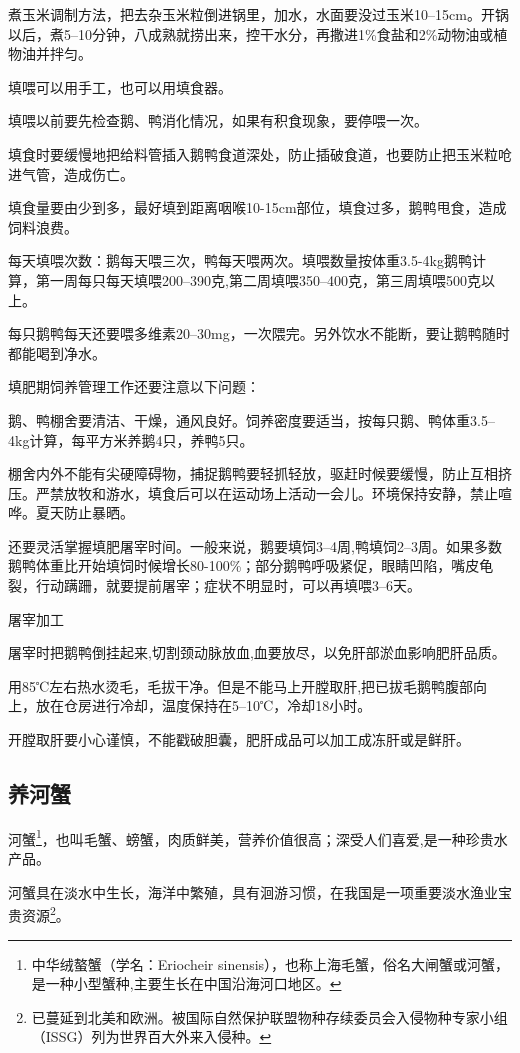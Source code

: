 \documentclass{ctexbook}
\begin{document}
煮玉米调制方法，把去杂玉米粒倒进锅里，加水，水面要没过玉米10--15cm。开锅以后，煮5--10分钟，八成熟就捞出来，控干水分，再撒进1\%食盐和2\%动物油或植物油并拌匀。

填喂可以用手工，也可以用填食器。

填喂以前要先检查鹅、鸭消化情况，如果有积食现象，要停喂一次。

填食时要缓慢地把给料管插入鹅鸭食道深处，防止插破食道，也要防止把玉米粒呛进气管，造成伤亡。

填食量要由少到多，最好填到距离咽喉10-15cm部位，填食过多，鹅鸭甩食，造成饲料浪费。

每天填喂次数：鹅每天喂三次，鸭每天喂两次。填喂数量按体重3.5-4kg鹅鸭计算，第一周每只每天填喂200--390克,第二周填喂350--400克，第三周填喂500克以上。

每只鹅鸭每天还要喂多维素20--30mg，一次隈完。另外饮水不能断，要让鹅鸭随时都能喝到净水。

填肥期饲养管理工作还要注意以下问题：

鹅、鸭棚舍要清洁、干燥，通风良好。饲养密度要适当，按每只鹅、鸭体重3.5--4kg计算，每平方米养鹅4只，养鸭5只。

棚舍内外不能有尖硬障碍物，捕捉鹅鸭要轻抓轻放，驱赶时候要缓慢，防止互相挤压。严禁放牧和游水，填食后可以在运动场上活动一会儿。环境保持安静，禁止喧哗。夏天防止暴晒。

还要灵活掌握填肥屠宰时间。一般来说，鹅要填饲3--4周,鸭填饲2--3周。如果多数鹅鸭体重比开始填饲时候增长80-100\%；部分鹅鸭呼吸紧促，眼睛凹陷，嘴皮龟裂，行动蹒跚，就要提前屠宰；症状不明显时，可以再填喂3--6天。

屠宰加工

屠宰时把鹅鸭倒挂起来,切割颈动脉放血,血要放尽，以免肝部淤血影响肥肝品质。

用85℃左右热水烫毛，毛拔干净。但是不能马上开膛取肝,把已拔毛鹅鸭腹部向上，放在仓房进行冷却，温度保持在5--10℃，冷却18小时。

开膛取肝要小心谨慎，不能戳破胆囊，肥肝成品可以加工成冻肝或是鲜肝。
\subsection{养河蟹}
河蟹\footnote{中华绒螯蟹（学名：Eriocheir sinensis），也称上海毛蟹，俗名大闸蟹或河蟹，是一种小型蟹种,主要生长在中国沿海河口地区。}，也叫毛蟹、螃蟹，肉质鲜美，营养价值很高；深受人们喜爱,是一种珍贵水产品。

河蟹具在淡水中生长，海洋中繁殖，具有洄游习惯，在我国是一项重要淡水渔业宝贵资源\footnote{已蔓延到北美和欧洲。被国际自然保护联盟物种存续委员会入侵物种专家小组（ISSG）列为世界百大外来入侵种。}。
\end{document}

